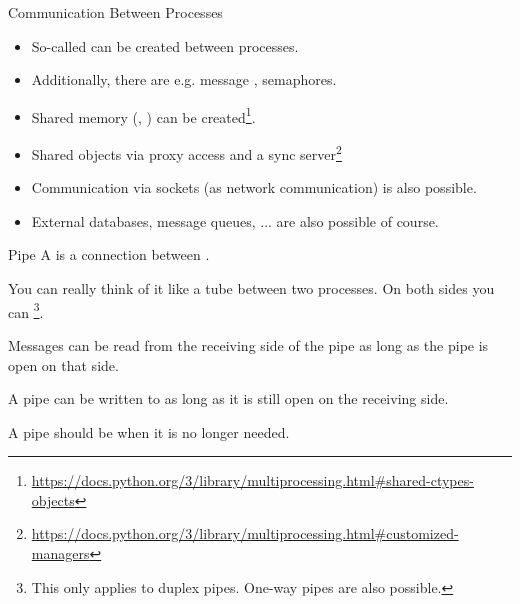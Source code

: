 \documentclass[12pt, aspectratio=169, usepdftitle=false, handout]{beamer}
\newcommand{\pp}[1]{\lpl{#1}}
\newcommand{\furl}[1]{\footnote{\url{#1}}}
\begin{document}
\begin{frame}[fragile]{Communication Between Processes}
	\begin{itemize}
		\item So-called  can be created between processes.
		\pause
		
		\item Additionally, there are e.g. message , semaphores.
		\pause
        \item Shared memory (\pp{Value}, \pp{Array}) can be created\furl{https://docs.python.org/3/library/multiprocessing.html\#shared-ctypes-objects}.
        \item Shared objects via proxy access and a sync server\furl{https://docs.python.org/3/library/multiprocessing.html\#customized-managers}
		\item Communication via sockets (as network communication) is also possible.
		\item External databases, message queues, ... are also possible of course.
	\end{itemize}
\end{frame}



\begin{frame}[fragile]{Pipe}
        A  is a connection between .

		\medskip
		
		You can really think of it like a tube between two processes.\newline
		On both sides you can \footnote{This only applies to duplex pipes. One-way pipes are also possible.}.
		
		\medskip
		
		Messages can be read from the receiving side of the pipe as long as the pipe is open on that side.
		
		\medskip
		
		A pipe can be written to as long as it is still open on the receiving side.
		
		\medskip
		
		A pipe should be  when it is no longer needed.

\end{frame}
\end{document}
